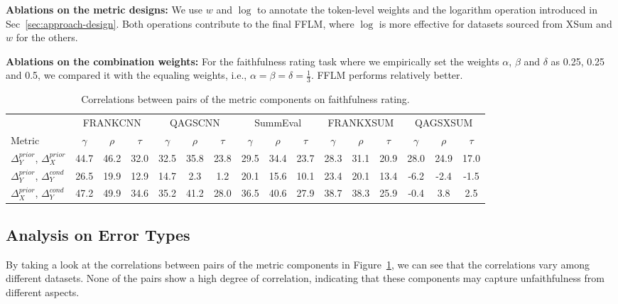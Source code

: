 \textbf{Ablations on the metric designs:} We use $w$ and $\log$ to annotate the token-level weights and the logarithm operation introduced in Sec~\ref{sec:approach-design}. Both operations contribute to the final FFLM, where $\log$ is more effective for datasets sourced from XSum and $w$ for the others.

\textbf{Ablations on the combination weights:} For the faithfulness rating task where we empirically set the weights $\alpha$, $\beta$ and $\delta$ as 0.25, 0.25 and 0.5, we compared it with the equaling weights, i.e., $\alpha=\beta=\delta=\frac{1}{3}$. FFLM performs relatively better.



\begin{table}[t]
	\scriptsize
	\centering
	\begin{tabular}{l|ccc|ccc|ccc|ccc|ccc}
		\toprule[1pt]
		& \multicolumn{3}{c}{FRANKCNN} & \multicolumn{3}{c}{QAGSCNN}  &  \multicolumn{3}{c}{SummEval}  & \multicolumn{3}{c}{FRANKXSUM}  & \multicolumn{3}{c}{QAGSXSUM} \\
		Metric & $\gamma$ &$\rho$ & $\tau$ & $\gamma$ &$\rho$ & $\tau$ & $\gamma$ &$\rho$ & $\tau$ & $\gamma$ &$\rho$ & $\tau$ & $\gamma$ &$\rho$ & $\tau$ \\
		\hline
		$\Delta_Y^{prior}$, $\Delta_X^{prior}$& 44.7 & 46.2 & 32.0 & 32.5 & 35.8 & 23.8 & 29.5 & 34.4 & 23.7 & 28.3 & 31.1 & 20.9 & 28.0 & 24.9 & 17.0 \\ 
		$\Delta_Y^{prior}$, $\Delta_Y^{cond}$ & 26.5 & 19.9 & 12.9 &  14.7 & 2.3 & 1.2 & 20.1 & 15.6 & 10.1 & {23.4} & {20.1} & {13.4} & {-6.2 }& {-2.4} & {-1.5}\\
		$\Delta_X^{prior}$, $\Delta_Y^{cond}$ & 47.2 & 49.9 & 34.6 & 35.2 & 41.2 & 28.0 & 36.5 & 40.6 & 27.9 & 38.7 & 38.3 & 25.9 & -0.4 & 3.8 & 2.5 \\
		
		\bottomrule[1pt]
	\end{tabular}
	\caption{Correlations between pairs of the metric components on faithfulness rating.}
	\label{tab:analysis-pairs-fr}
\end{table}


\subsection{Analysis on Error Types}
\label{sec:errortype}

By taking a look at the correlations between pairs of the metric components in Figure~\ref{tab:analysis-pairs-fr}, we can see that the correlations vary among different datasets. None of the pairs show a high degree of correlation, indicating that these components may capture unfaithfulness from different aspects.

